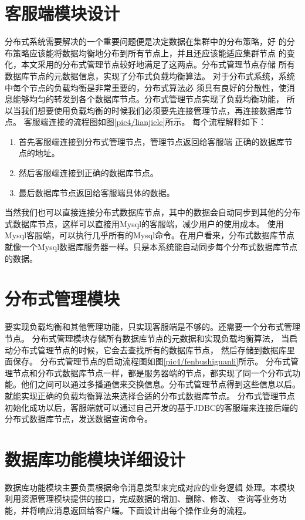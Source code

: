 \section{客服端模块设计}
分布式系统需要解决的一个重要问题便是决定数据在集群中的分布策略，好
的分布策略应该能将数据均衡地分布到所有节点上，并且还应该能适应集群节点
的变化，本文采用的分布式管理节点较好地满足了这两点。分布式管理节点存储
所有数据库节点的元数据信息，实现了分布式负载均衡算法。
对于分布式系统，系统中每个节点的负载均衡是非常重要的，分布式算法必
须具有良好的分散性，使消息能够均匀的转发到各个数据库节点。分布式管理节点实现了负载均衡功能，
所以当我们想要使用负载均衡的时候我们必须要先连接管理节点，再连接数据库节点。
客服端连接的流程图如图\ref{pic4/lianjielc}所示。
每个流程解释如下：
\begin{enumerate}[fullwidth,itemindent=2em,listparindent=2em]
	\item 首先客服端连接到分布式管理节点，管理节点返回给客服端
	正确的数据库节点的地址。
	\item 然后客服端连接到正确的数据库节点。
	\item 最后数据库节点返回给客服端具体的数据。
\end{enumerate}
当然我们也可以直接连接分布式数据库节点，其中的数据会自动同步到其他的分布式数据库节点，这样可以直接用Mysql的客服端，减少用户的使用成本。
使用Mysql客服端，可以执行几乎所有的Mysql命令。在用户看来，分布式数据库节点就像一个Mysql数据库服务器一样。只是本系统能自动同步每个分布式数据库节点的数据。
\section{分布式管理模块}
要实现负载均衡和其他管理功能，只实现客服端是不够的。还需要一个分布式管理节点。
分布式管理模块存储所有数据库节点的元数据和实现负载均衡算法，
当启动分布式管理节点的时候，它会去查找所有的数据库节点，
然后存储到数据库里面保存。
分布式管理节点的启动流程图如图\ref{pic4/fenbushiguanli}所示。
分布式管理节点和分布式数据库节点一样，都是服务器端的节点，都实现了同一个分布式功能。他们之间可以通过多播通信来交换信息。分布式管理节点得到这些信息以后。就能实现正确的负载均衡算法来选择合适的分布式数据库节点。
分布式管理节点初始化成功以后，客服端就可以通过自己开发的基于JDBC的客服端来连接后端的分布式数据库节点，发送数据查询命令。
\section{数据库功能模块详细设计}
数据库功能模块主要负责根据命令消息类型来完成对应的业务逻辑
处理。本模块利用资源管理模块提供的接口，完成数据的增加、删除、修改、
查询等业务功能，并将响应消息返回给客户端。下面设计出每个操作业务的流程。
